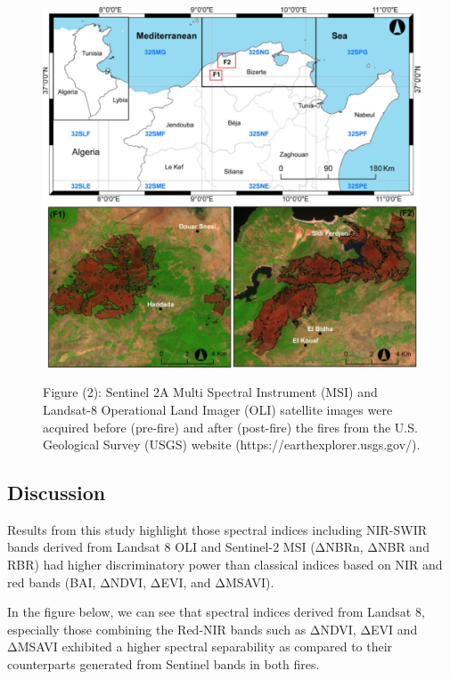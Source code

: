 \documentclass[
  letterpaper,
  DIV=11,
  numbers=noendperiod]{scrreprt}
\begin{document}
\begin{figure}

{\centering 

\href{https://earthexplorer.usgs.gov/}{\includegraphics[width=5.20833in,height=\textheight]{application 1.jpg}}

}

\caption{Figure (2): Sentinel 2A Multi Spectral Instrument (MSI) and
Landsat-8 Operational Land Imager (OLI) satellite images were acquired
before (pre-fire) and after (post-fire) the fires from the U.S.
Geological Survey (USGS) website (https://earthexplorer.usgs.gov/).}

\end{figure}

\hypertarget{discussion}{%
\subsection{Discussion}\label{discussion}}

Results from this study highlight those spectral indices including
NIR-SWIR bands derived from Landsat 8 OLI and Sentinel-2 MSI (ΔNBRn,
ΔNBR and RBR) had higher discriminatory power than classical indices
based on NIR and red bands (BAI, ΔNDVI, ΔEVI, and ΔMSAVI).

In the figure below, we can see that spectral indices derived from
Landsat 8, especially those combining the Red-NIR bands such as ΔNDVI,
ΔEVI and ΔMSAVI exhibited a higher spectral separability as compared to
their counterparts generated from Sentinel bands in both fires.
\end{document}
